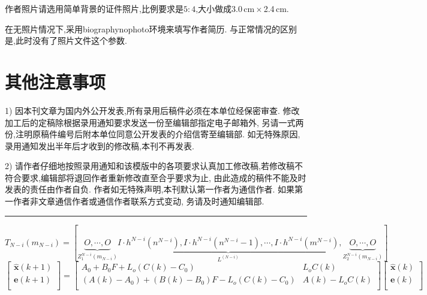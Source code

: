 \documentclass{Style/aas}
\begin{document}
\begin{multicols}{2}
  作者照片请选用简单背景的证件照片,比例要求是$5:4$,大小做成3.0\,cm\,$\times$\,2.4\,cm.

  在无照片情况下,采用biographynophoto环境来填写作者简历.
  与正常情况的区别是,此时没有了照片文件这个参数.

  \section{其他注意事项}

  1) 因本刊文章为国内外公开发表,所有录用后稿件必须在本单位经保密审查.
  修改加工后的定稿除根据录用通知要求发送一份至编辑部指定电子邮箱外,
  另请一式两份,注明原稿件编号后附本单位同意公开发表的介绍信寄至编辑部.
  如无特殊原因,录用通知发出半年后才收到的修改稿,本刊不再发表.

  2)
  请作者仔细地按照录用通知和该模版中的各项要求认真加工修改稿,若修改稿不符合要求,编辑部将退回作者重新修改直至合乎要求为止,
  由此造成的稿件不能及时发表的责任由作者自负.
  作者如无特殊声明,本刊默认第一作者为通信作者.
  如果第一作者非文章通信作者或通信作者联系方式变动,
  务请及时通知编辑部.


\end{multicols}%
\vskip1mm
\hrule
\begin{equation}
  T_{N-i}(m_{N-i})= \left[ \underbrace{O,\cdots,
    O}_{Z_1^{N-i}(m_{N-i})} \underbrace{I \cdot h^{N-i}(n^{N-i}), I
    \cdot h^{N-i}(n^{N-i}-1),\cdots, I \cdot
    h^{N-i}(m^{N-i})}_{L^{(N-i)}},\underbrace{O,\cdots,
    O}_{Z_2^{N-i}(m_{N-i})} \right]\tag{3}
\end{equation}
\begin{equation} \left[
    \begin{array}{c}
      \hat{{\pmb x}}(k+1) \\
      {\pmb e}(k+1)       \\
    \end{array}
    \right]=\left[
    \begin{array}{cc}
      A_0+B_0F+L_o(C(k)-C_0)               & L_oC(k)      \\
      (A(k)-A_0)+(B(k)-B_0)F-L_o(C(k)-C_0) & A(k)-L_oC(k) \\
    \end{array}
    \right]\left[
    \begin{array}{c}
      \hat{{\pmb x}}(k) \\
      {\pmb e} (k)      \\
    \end{array}
    \right]\tag{4}
\end{equation}
\begin{multicols}{2}%

\end{multicols}%
\end{document}
